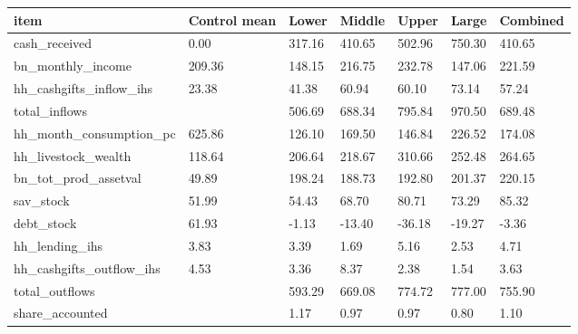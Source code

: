 \begin{tabular}{lllllll}
\toprule
item & Control mean & Lower & Middle & Upper & Large & Combined
 \\
\midrule
cash\_received & 0.00 & 317.16 & 410.65 & 502.96 & 750.30 & 410.65 \\
bn\_monthly\_income & 209.36 & 148.15 & 216.75 & 232.78 & 147.06 & 221.59 \\
hh\_cashgifts\_inflow\_ihs & 23.38 & 41.38 & 60.94 & 60.10 & 73.14 & 57.24 \\
total\_inflows &  & 506.69 & 688.34 & 795.84 & 970.50 & 689.48 \\
hh\_month\_consumption\_pc & 625.86 & 126.10 & 169.50 & 146.84 & 226.52 & 174.08 \\
hh\_livestock\_wealth & 118.64 & 206.64 & 218.67 & 310.66 & 252.48 & 264.65 \\
bn\_tot\_prod\_assetval & 49.89 & 198.24 & 188.73 & 192.80 & 201.37 & 220.15 \\
sav\_stock & 51.99 & 54.43 & 68.70 & 80.71 & 73.29 & 85.32 \\
debt\_stock & 61.93 & -1.13 & -13.40 & -36.18 & -19.27 & -3.36 \\
hh\_lending\_ihs & 3.83 & 3.39 & 1.69 & 5.16 & 2.53 & 4.71 \\
hh\_cashgifts\_outflow\_ihs & 4.53 & 3.36 & 8.37 & 2.38 & 1.54 & 3.63 \\
total\_outflows &  & 593.29 & 669.08 & 774.72 & 777.00 & 755.90 \\
share\_accounted &  & 1.17 & 0.97 & 0.97 & 0.80 & 1.10 \\
\bottomrule
\end{tabular}
